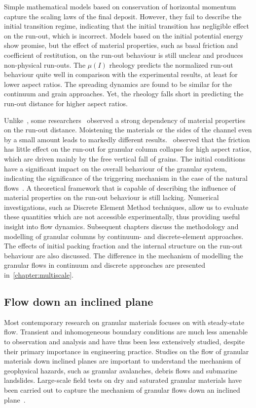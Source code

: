 Simple mathematical models based on conservation of horizontal momentum capture 
the scaling laws of the final deposit. However, they fail to describe the 
initial transition regime, indicating that the initial transition has 
negligible effect on the run-out, which is incorrect. Models based on the 
initial potential energy show promise, but the effect of material properties, 
such as basal friction and coefficient of restitution, on the run-out behaviour 
is still unclear and produces non-physical run-outs. The $\mu(\textit{I})$ 
rheology predicts the normalized run-out behaviour quite well in comparison 
with the experimental results, at least for lower aspect ratios. The spreading 
dynamics are found to be similar for the continuum and grain approaches. Yet, 
the rheology falls short in predicting the run-out distance for higher aspect 
ratios. 

Unlike~\citet{Lube2005}, some 
researchers~\citep{Balmforth2005,Kerswell2005} observed a strong dependency of 
material properties on the run-out distance. Moistening the materials or the 
sides of the channel even by a small amount leads to markedly different 
results.~\citet{Staron2007a} observed that the friction has little effect on 
the run-out for granular column collapse for high aspect ratios, which are 
driven mainly by the free vertical fall of grains. The initial conditions have 
a significant impact on the overall behaviour of the granular system, 
indicating the significance of the triggering mechanism in the case of the 
natural flows~\citep{Staron2007a}. A theoretical framework that is capable of 
describing the influence of material properties on the run-out behaviour is 
still lacking. Numerical investigations, such as Discrete Element 
Method techniques, allow us to evaluate these quantities which are not 
accessible experimentally, thus providing useful insight into flow 
dynamics. Subsequent chapters discuss the methodology and modelling of granular 
columns by continuum- and discrete-element approaches. The effects of initial 
packing fraction and the internal structure on the run-out behaviour are also 
discussed. The difference in the mechanism of modelling the granular flows in 
continuum and discrete approaches are presented in~\cref{chapter:multiscale}.

\subsection{Flow down an inclined plane}

Most contemporary research on granular materials focuses on
with steady-state flow. Transient and inhomogeneous boundary conditions 
are much less amenable to observation and analysis and have thus been less 
extensively studied, despite their primary importance in engineering practice. 
Studies on the flow of granular materials down inclined planes are important to 
understand the mechanism of geophysical hazards, such as granular avalanches, 
debris flows and submarine landslides. Large-scale field tests on dry and 
saturated granular materials have been carried out to capture the mechanism of 
granular flows down an inclined plane~\citep{Okada2008,Denlinger2001}.


